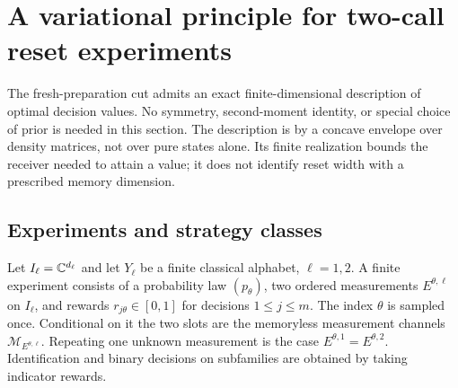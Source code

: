 \section{A variational principle for two-call reset experiments}
\label{sec:resetvariational91}
The fresh-preparation cut admits an exact finite-dimensional description
of optimal decision values.  No symmetry, second-moment identity, or
special choice of prior is needed in this section.  The description is
by a concave envelope over density matrices, not over pure states alone.
Its finite realization bounds the receiver needed to attain a value;
it does not identify reset width with a prescribed memory dimension.

\subsection{Experiments and strategy classes}
Let $I_\ell=\mathbb C^{d_\ell}$ and let $Y_\ell$ be a finite classical alphabet,
$\ell=1,2$.  A finite experiment consists of a probability law
$(p_\theta)$, two ordered measurements $E^{\theta,\ell}$ on $I_\ell$,
and rewards $r_{j\theta}\in[0,1]$ for decisions $1\le j\le m$.
The index $\theta$ is sampled once.  Conditional on it the two slots are
the memoryless measurement channels $\mathcal M_{E^{\theta,\ell}}$.
Repeating one unknown measurement is the case
$E^{\theta,1}=E^{\theta,2}$.  Identification and binary decisions on
subfamilies are obtained by taking indicator rewards.

